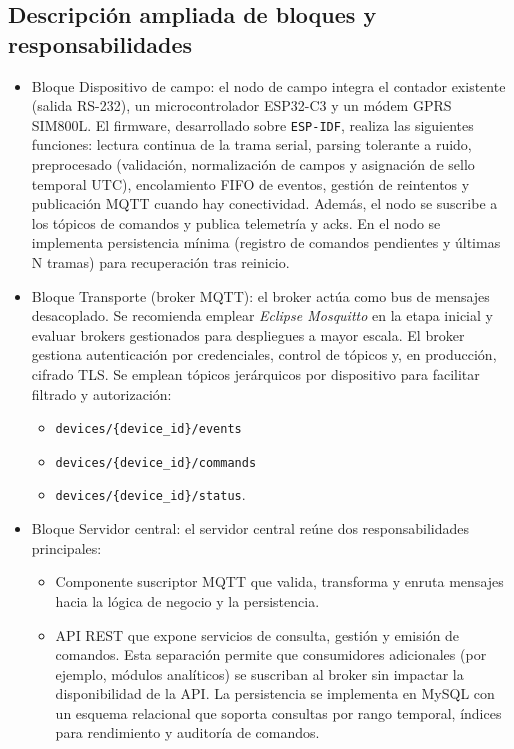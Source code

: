 \subsection{Descripción ampliada de bloques y responsabilidades}
\begin{itemize}

  \item {Bloque  Dispositivo de campo:} el nodo de campo integra el contador existente (salida RS-232), un microcontrolador ESP32-C3 y un módem GPRS SIM800L. El firmware, desarrollado sobre \texttt{ESP-IDF}, realiza las siguientes funciones: lectura continua de la trama serial, parsing tolerante a ruido, preprocesado (validación, normalización de campos y asignación de sello temporal UTC), encolamiento FIFO de eventos, gestión de reintentos y publicación MQTT cuando hay conectividad. Además, el nodo se suscribe a los tópicos de comandos y publica telemetría y acks. En el nodo se implementa persistencia mínima (registro de comandos pendientes y últimas N tramas) para recuperación tras reinicio.

  \item {Bloque Transporte (broker MQTT):} el broker actúa como bus de mensajes desacoplado. Se recomienda emplear \textit{Eclipse Mosquitto} en la etapa inicial y evaluar brokers gestionados para despliegues a mayor escala. El broker gestiona autenticación por credenciales, control de tópicos y, en producción, cifrado TLS. Se emplean tópicos jerárquicos por dispositivo para facilitar filtrado y autorización: 
\begin{itemize}
  \item \texttt{devices/\{device\_id\}/events}
  \item \texttt{devices/\{device\_id\}/commands} 
  \item \texttt{devices/\{device\_id\}/status}.
\end{itemize}


\item {Bloque Servidor central:} el servidor central reúne dos responsabilidades principales: 

\begin{itemize}  

\item  Componente suscriptor MQTT que valida, transforma y enruta mensajes hacia la lógica de negocio y la persistencia.

\item API REST que expone servicios de consulta, gestión y emisión de comandos. Esta separación permite que consumidores adicionales (por ejemplo, módulos analíticos) se suscriban al broker sin impactar la disponibilidad de la API. La persistencia se implementa en MySQL con un esquema relacional que soporta consultas por rango temporal, índices para rendimiento y auditoría de comandos.
 \end{itemize}


\end{itemize}
